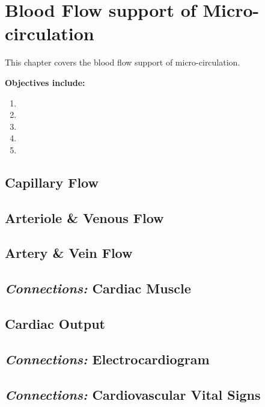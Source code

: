 \chapter{Blood Flow support of Micro-circulation}\label{chp:blood_flow}

\minitoc
This chapter covers the blood flow support of micro-circulation. 

\vspace{5mm}

\textbf{Objectives include:}
\begin{enumerate}
    \item
    \item
    \item
    \item
    \item
\end{enumerate}

\section{Capillary Flow}

\section{Arteriole \& Venous Flow}

\section{Artery \& Vein Flow}

\section{\textit{Connections:} Cardiac Muscle}

\section{Cardiac Output}

\section{\textit{Connections:} Electrocardiogram}

\section{\textit{Connections:} Cardiovascular Vital Signs}

\printbibliography[heading=subbibintoc]